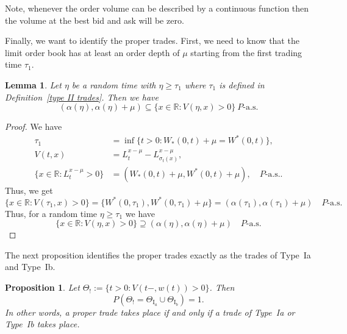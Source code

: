 \documentclass[11pt]{scrartcl}
\newtheorem{lemma}[theorem]{Lemma}
\newtheorem{proposition}[theorem]{Proposition}
\begin{document}
Note, whenever the order volume can be described by a continuous function
then the volume at the best bid and ask will be zero.

Finally, we want to identify the proper trades. First, we need to know that the limit order book has at
least an order depth of $\mu$ starting from the first trading time $\tau_1$.

\begin{lemma}
\label{l:lob open interval} Let $\eta$ be a random time with $\eta\geq
\tau_1 $ where $\tau_1$ is defined in Definition~\ref{type II trades}. Then
we have 
\begin{equation*}
(\alpha(\eta),\alpha(\eta)+\mu)\subseteq \{x\in\mathbb{R}:V(\eta,x)>0\}~\mbox{$P$-a.s.}
\end{equation*}
\end{lemma}

\begin{proof}
  We have 
    \begin{align*}
     \tau_1 &= \inf\{t>0: W_\ast(0,t)+\mu = W^\ast(0,t) \}, \\
     V(t,x) &= L_t^{x-\mu} - L^{x-\mu}_{\sigma_t(x)}, \\
     \{x\in\mathbb R:L_t^{x-\mu}>0\} &= (W_\ast(0,t)+\mu,W^\ast(0,t)+\mu),\quad P\text{-a.s.}.
    \end{align*}  
 Thus, we get 
 $$\{x\in\mathbb R: V(\tau_1,x) > 0\} = \{W^\ast(0,\tau_1),W^\ast(0,\tau_1)+\mu\}=(\alpha(\tau_1),\alpha(\tau_1)+\mu)
 \quad\mbox{$P$-a.s.}$$
Thus, for a random time $\eta\geq \tau_1$ we have
$$\{x\in\mathbb R: V(\eta,x) > 0\} \supseteq (\alpha(\eta),\alpha(\eta)+\mu)\quad\mbox{$P$-a.s.}$$
\end{proof}
The next proposition identifies the proper trades exactly as the trades of
Type~{Ia} and Type~{Ib}.
\begin{proposition}
\label{p: proper trades} Let $\Theta_!:=\{t>0: V(t-,w(t))>0\}$. Then 
\begin{equation*}
P(\Theta_! = \Theta_{\mathrm{I}_a} \cup \Theta_{\mathrm{I}_b}) = 1.
\end{equation*}
In other words, a proper trade takes place if and only if a trade of Type~{Ia} or Type~{Ib}
takes place.
\end{proposition}
\end{document}
